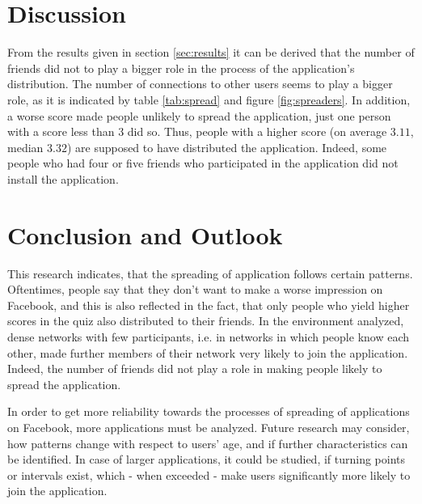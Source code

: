 \documentclass[preprint,12pt]{elsarticle}
\begin{document}
\section{Discussion}
\label{sec:discussion}
From the results given in section \ref{sec:results} it can be derived
that the number of friends did not to play a bigger role in the
process of the application's distribution. The number of connections
to other users seems to play a bigger 
role, as it is indicated by table \ref{tab:spread} and figure
\ref{fig:spreaders}. In addition, a worse score made people unlikely
to spread the application, just one person with a score less than 3
did so. Thus, people with a higher score (on average $3.11$, median $3.32$) are
supposed to have distributed the application. Indeed, some people who
had four or five friends who participated in the application did not
install the application.


\section{Conclusion and Outlook}
\label{sec:conclusion}
This research indicates, that the spreading of application follows
certain patterns. Oftentimes, people say that they don't want to
make a worse impression on Facebook, and this is also reflected in the
fact, that only people who yield higher scores in the quiz also
distributed to their friends. In the environment analyzed, dense
networks with few participants, i.e. in networks in which people know
each other, made  further members of their network very likely to join
the application. Indeed, the number of friends did not play a role in
making people likely to spread the application.


In order to get more reliability towards the processes of spreading
of applications on Facebook, more applications must be analyzed.
Future research may consider, how patterns change with respect
to users' age, and if further characteristics can be identified. In
case of larger applications, it could be studied, if turning points
or intervals exist, which - when exceeded - make users significantly
more likely to join the application.





\end{document}
